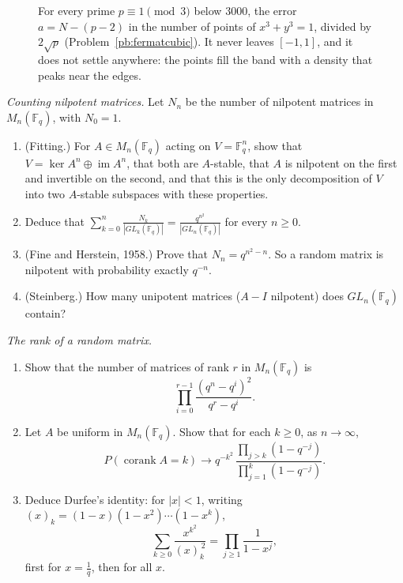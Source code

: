 \begin{figure}[ht]
\centering
{}
\caption{For every prime $p\equiv1\pmod3$ below $3000$, the error $a=N-(p-2)$ in the number of points of $x^3+y^3=1$, divided by
$2\sqrt p$ (Problem~\ref{pb:fermatcubic}). It never leaves $[-1,1]$, and it does not settle anywhere: the points fill the band
with a density that peaks near the edges.}
\label{fig:cubic}
\end{figure}

\begin{exercise}[$\star\star\star$]\label{pb:nilpotent}
\emph{Counting nilpotent matrices.} Let $N_n$ be the number of nilpotent matrices in $M_n(\mathbb F_q)$, with $N_0=1$.
\begin{enumerate}[label=(\alph*)]
\item (Fitting.) For $A\in M_n(\mathbb F_q)$ acting on $V=\mathbb F_q^n$, show that $V=\ker A^n\oplus\operatorname{im}A^n$,
that both are $A$-stable, that $A$ is nilpotent on the first and invertible on the second, and that this is the only
decomposition of $V$ into two $A$-stable subspaces with these properties.
\item Deduce that $\displaystyle\sum_{k=0}^n\frac{N_k}{|GL_k(\mathbb F_q)|}=\frac{q^{n^2}}{|GL_n(\mathbb F_q)|}$ for every $n\ge0$.
\item (Fine and Herstein, 1958.) Prove that $N_n=q^{n^2-n}$. So a random matrix is nilpotent with probability exactly $q^{-n}$.
\item (Steinberg.) How many unipotent matrices ($A-I$ nilpotent) does $GL_n(\mathbb F_q)$ contain?
\end{enumerate}
\end{exercise}

\begin{exercise}[$\star\star$]\label{pb:rankdist}
\emph{The rank of a random matrix.}
\begin{enumerate}[label=(\alph*)]
\item Show that the number of matrices of rank $r$ in $M_n(\mathbb F_q)$ is
\[
\prod_{i=0}^{r-1}\frac{(q^n-q^i)^2}{q^r-q^i}.
\]
\item Let $A$ be uniform in $M_n(\mathbb F_q)$. Show that for each $k\ge0$, as $n\to\infty$,
\[
P(\operatorname{corank}A=k)\longrightarrow q^{-k^2}\,\frac{\prod_{j>k}(1-q^{-j})}{\prod_{j=1}^k(1-q^{-j})}.
\]
\item Deduce Durfee's identity: for $|x|<1$, writing $(x)_k=(1-x)(1-x^2)\cdots(1-x^k)$,
\[
\sum_{k\ge0}\frac{x^{k^2}}{(x)_k^{\,2}}=\prod_{j\ge1}\frac1{1-x^j},
\]
first for $x=\frac1q$, then for all $x$.
\end{enumerate}
\end{exercise}


